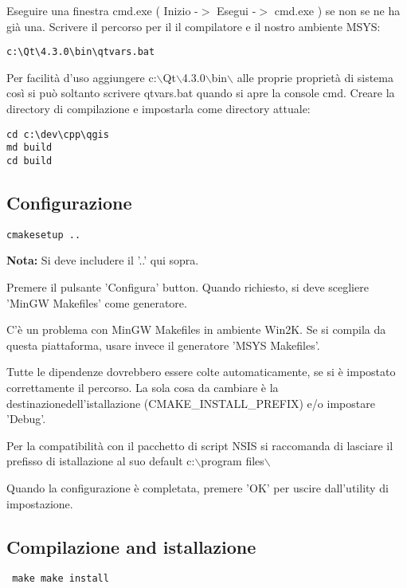 Eseguire una finestra cmd.exe ( Inizio -$>$ Esegui -$>$ cmd.exe ) se non se ne ha già una. Scrivere il percorso per il il compilatore e il nostro ambiente MSYS:

\begin{verbatim}
c:\Qt\4.3.0\bin\qtvars.bat 
\end{verbatim}

Per facilità d'uso aggiungere c:$\backslash$Qt$\backslash$4.3.0$\backslash$bin$\backslash$ alle proprie proprietà di sistema così si può soltanto scrivere qtvars.bat quando si apre la console cmd.
Creare la directory di compilazione e impostarla come directory attuale:

\begin{verbatim}
cd c:\dev\cpp\qgis 
md build 
cd build 
\end{verbatim}

\subsection{Configurazione}
\begin{verbatim}
cmakesetup ..  
\end{verbatim}

\textbf{Nota:} Si deve includere il '..' qui sopra.

Premere il pulsante 'Configura' button. Quando richiesto, si deve scegliere 'MinGW Makefiles' come generatore.

C'è un problema con MinGW Makefiles in ambiente Win2K. Se si compila da questa piattaforma, usare invece il generatore 'MSYS Makefiles'.

Tutte le dipendenze dovrebbero essere colte automaticamente, se si è impostato correttamente il percorso. La sola cosa da cambiare è la destinazionedell'istallazione (CMAKE\_INSTALL\_PREFIX) e/o impostare 'Debug'.

Per la compatibilità con il pacchetto di script NSIS si raccomanda di lasciare il prefisso di istallazione al suo default c:$\backslash$program files$\backslash$

Quando la configurazione è completata, premere 'OK' per uscire dall'utility di impostazione.

\subsection{Compilazione and istallazione}
\begin{verbatim}
 make make install 
\end{verbatim}

